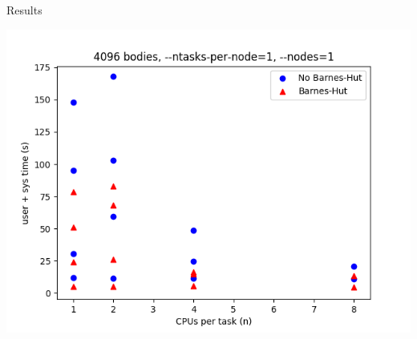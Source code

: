 \documentclass{beamer}
\begin{document}
\begin{frame}[allowframebreaks]{Results}
\framebreak

\includegraphics[width=\linewidth]{scaling}

\end{frame}
\end{document}
